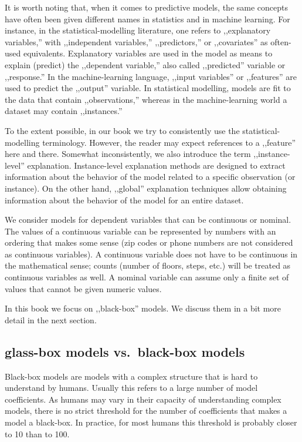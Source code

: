 \documentclass[12pt,]{krantz}
\theoremstyle{definition}
\theoremstyle{definition}
\theoremstyle{definition}
\theoremstyle{remark}
\begin{document}
It is worth noting that, when it comes to predictive models, the same
concepts have often been given different names in statistics and in
machine learning. For instance, in the statistical-modelling literature,
one refers to ,,explanatory variables,'' with ,,independent variables,''
,,predictors,'' or ,,covariates'' as often-used equivalents. Explanatory
variables are used in the model as means to explain (predict) the
,,dependent variable,'' also called ,,predicted'' variable or
,,response.'' In the machine-learning language, ,,input variables'' or
,,features'' are used to predict the ,,output'' variable. In statistical
modelling, models are fit to the data that contain ,,observations,''
whereas in the machine-learning world a dataset may contain
,,instances.''

To the extent possible, in our book we try to consistently use the
statistical-modelling terminology. However, the reader may expect
references to a ,,feature'' here and there. Somewhat inconsistently, we
also introduce the term ,,instance-level'' explanation. Instance-level
explanation methods are designed to extract information about the
behavior of the model related to a specific observation (or instance).
On the other hand, ,,global'' explanation techniques allow obtaining
information about the behavior of the model for an entire dataset.

We consider models for dependent variables that can be continuous or
nominal. The values of a continuous variable can be represented by
numbers with an ordering that makes some sense (zip codes or phone
numbers are not considered as continuous variables). A continuous
variable does not have to be continuous in the mathematical sense;
counts (number of floors, steps, etc.) will be treated as continuous
variables as well. A nominal variable can assume only a finite set of
values that cannot be given numeric values.

In this book we focus on ,,black-box'' models. We discuss them in a bit
more detail in the next section.

\hypertarget{glass-box-models-vs.black-box-models}{%
\subsection{glass-box models vs.~black-box
models}\label{glass-box-models-vs.black-box-models}}

Black-box models are models with a complex structure that is hard to
understand by humans. Usually this refers to a large number of model
coefficients. As humans may vary in their capacity of understanding
complex models, there is no strict threshold for the number of
coefficients that makes a model a black-box. In practice, for most
humans this threshold is probably closer to 10 than to 100.
\end{document}
